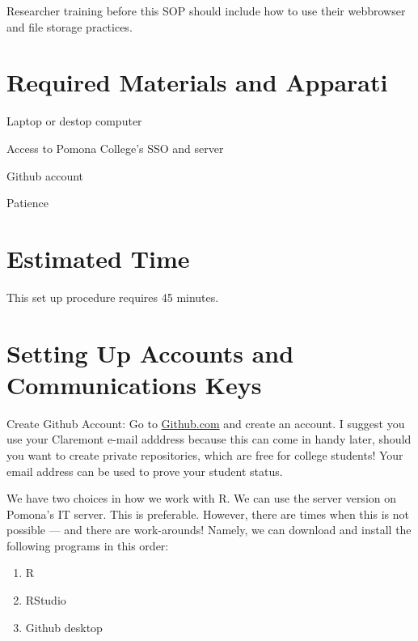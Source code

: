 \documentclass[12pt]{../SOP3_beta}
\begin{document}
\NP Researcher training before this SOP should include how to use their webbrowser and file storage practices. 


\section{Required Materials and Apparati}

\NP Laptop or destop computer

\NP Access to Pomona College's SSO and server

\NP Github account

\NP Patience


\section{Estimated Time}

\NP This set up procedure requires 45 minutes.



\section{Setting Up Accounts and Communications Keys}

\NP Create Github Account: Go to \href{http:\\github.com}{Github.com} and create an account. I suggest you use your Claremont e-mail adddress because this can come in handy later, should you want to create private repositories, which are free for college students! Your email address can be used to prove your student status.
  
\NP We have two choices in how we work with R. We can use the server version on Pomona's IT server. This is preferable. However, there are times when this is not possible --- and there are work-arounds!  Namely, we can download and install the following programs in this order: 

\begin{enumerate}
  \item R 
  \item RStudio
  \item Github desktop
\end{enumerate}
\end{document}
